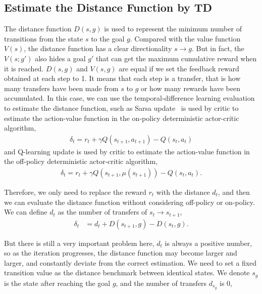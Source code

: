 \documentclass[8pt,twoside,a4paper]{article}
\begin{document}
\subsection{Estimate the Distance Function by TD}
The distance function $D(s,g)$ is used to represent the minimum number of transitions from the state $s$ to the goal $g$. Compared with the value function $V(s)$, the distance function has a clear directionality $s\rightarrow g$. But in fact, the $V(s;g')$ also hides a goal $g'$ that can get the maximum cumulative reward when it is reached. $D(s,g)$ and $V(s,g)$ are equal if we set the feedback reward obtained at each step to 1. It means that each step is a transfer, that is how many transfers have been made from $s$ to $g$ or how many rewards have been accumulated. In this case, we can use the temporal-difference learning evaluation to estimate the distance function, such as Sarsa update~\cite{sutton1998introduction} is used by critic to estimate the action-value function in the on-policy deterministic actor-critic algorithm,
\begin{equation}
\begin{aligned}
\delta_t =r_t + \gamma Q(s_{t+1},a_{t+1})-Q(s_t,a_t)
\end{aligned}
\end{equation}
and Q-learning update is used by critic to estimate the action-value function in the off-policy deterministic actor-critic algorithm,
\begin{equation}
\begin{aligned}
\delta_t =r_t + \gamma Q(s_{t+1},\mu(s_{t+1}))-Q(s_t,a_t).
\end{aligned}
\end{equation}
\par Therefore, we only need to replace the reward $r_t$ with the distance $d_t$, and then we can evaluate the distance function without considering off-policy or on-policy. We can define $d_t$ as the number of transfers of $s_t \rightarrow s_{t+1}$,
\begin{equation}
\begin{aligned}
\delta_t &=d_t + D(s_{t+1},g)-D(s_t,g).
\end{aligned}
\end{equation}
\par But there is still a very important problem here, $d_t$ is always a positive number, so as the iteration progresses, the distance function may become larger and larger, and constantly deviate from the correct estimation. We need to set a fixed transition value as the distance benchmark between identical states. We denote $s_g$ is the state after reaching the goal $g$, and the number of transfers $d_{s_g}$ is 0,
\end{document}

